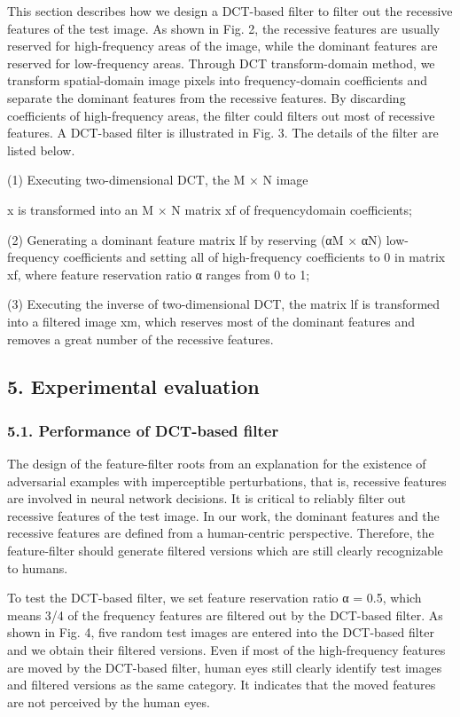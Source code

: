 \documentclass{article}
\begin{document}
This section describes how we design a DCT-based filter to filter out the recessive features of the test image. As shown in Fig. 2, the recessive features are usually reserved for high-frequency areas of the image, while the dominant features are reserved for low-frequency areas. Through DCT transform-domain method, we transform spatial-domain image pixels into frequency-domain coefficients and separate the dominant features from the recessive features. By discarding coefficients of high-frequency areas, the filter could filters out most of recessive features. A DCT-based filter is illustrated in Fig. 3. The details of the filter are listed below.

(1) Executing two-dimensional DCT, the M × N image

x is transformed into an M × N matrix xf of frequencydomain coefficients;

(2) Generating a dominant feature matrix lf by reserving (αM × αN) low-frequency coefficients and setting all of high-frequency coefficients to 0 in matrix xf, where feature reservation ratio α ranges from 0 to 1;

(3) Executing the inverse of two-dimensional DCT, the matrix lf is transformed into a filtered image xm, which reserves most of the dominant features and removes a great number of the recessive features.

\subsection{5. Experimental evaluation}

\subsubsection{5.1. Performance of DCT-based filter}

The design of the feature-filter roots from an explanation for the existence of adversarial examples with imperceptible perturbations, that is, recessive features are involved in neural network decisions. It is critical to reliably filter out recessive features of the test image. In our work, the dominant features and the recessive features are defined from a human-centric perspective. Therefore, the feature-filter should generate filtered versions which are still clearly recognizable to humans.

To test the DCT-based filter, we set feature reservation ratio α = 0.5, which means 3/4 of the frequency features are filtered out by the DCT-based filter. As shown in Fig. 4, five random test images are entered into the DCT-based filter and we obtain their filtered versions. Even if most of the high-frequency features are moved by the DCT-based filter, human eyes still clearly identify test images and filtered versions as the same category. It indicates that the moved features are not perceived by the human eyes.
\end{document}
